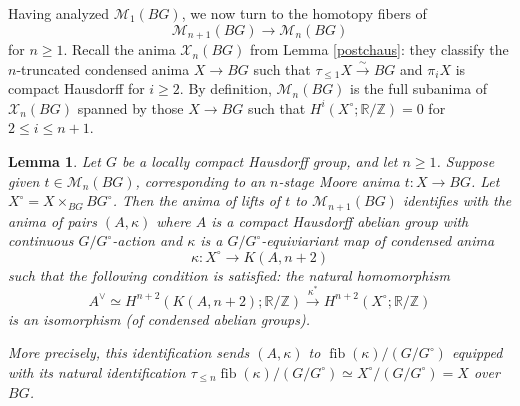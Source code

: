 \documentclass[12pt]{article}
\newtheorem{lemma}[theorem]{Lemma}
\theoremstyle{definition}
\newcommand{\on}{\operatorname}
\newcommand{\mc}{\mathcal}
\newcommand{\mbb}{\mathbb}
\begin{document}
Having analyzed $\mc{M}_1(BG)$, we now turn to the homotopy fibers of
$$\mc{M}_{n+1}(BG) \to \mc{M}_n(BG)$$
for $n\geq 1$.  Recall the anima $\mc{X}_n(BG)$ from Lemma \ref{postchaus}: they classify the $n$-truncated condensed anima $X\to BG$ such that $\tau_{\leq 1}X\overset{\sim}{\rightarrow}BG$ and $\pi_iX$ is compact Hausdorff for $i\geq 2$.  By definition, $\mc{M}_n(BG)$ is the full subanima of $\mc{X}_n(BG)$ spanned by those $X\to BG$ such that $H^i(X^\circ;\mbb{R}/\mbb{Z})=0$ for $2\leq i\leq n+1$.

\begin{lemma}\label{mooreinduct}
Let $G$ be a locally compact Hausdorff group, and let $n\geq 1$.  Suppose given $t\in \mc{M}_n(BG)$, corresponding to an $n$-stage Moore anima $t:X\to BG$.  Let $X^\circ= X\times_{BG} BG^\circ$.  Then the anima of lifts of $t$ to $\mc{M}_{n+1}(BG)$ identifies with the anima of pairs $(A,\kappa)$ where $A$ is a compact Hausdorff abelian group with continuous $G/G^\circ$-action and $\kappa$ is a $G/G^\circ$-equiviariant map of condensed anima
$$\kappa: X^\circ \to K(A,n+2)$$
such that the following condition is satisfied: the natural homomorphism
$$A^\vee \simeq H^{n+2}(K(A,n+2);\mbb{R}/\mbb{Z}) \overset{\kappa^\ast}{\longrightarrow} H^{n+2}(X^\circ;\mbb{R}/\mbb{Z})$$
is an isomorphism (of condensed abelian groups).

More precisely, this identification sends $(A,\kappa)$ to $\on{fib}(\kappa)/(G/G^\circ)$ equipped with its natural identification $\tau_{\leq n}\on{fib}(\kappa)/(G/G^\circ) \simeq X^\circ/(G/G^\circ) = X$ over $BG$.
\end{lemma}
\end{document}
